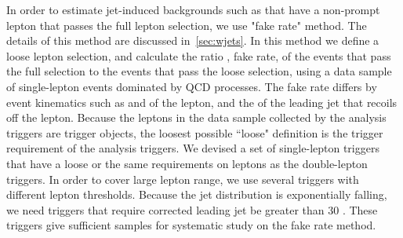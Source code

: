 In order to estimate jet-induced backgrounds such as \Wjets{} that have a non-prompt 
lepton that passes the full lepton selection, we use "fake rate" method.  
The details of this method are discussed in~\ref{sec:wjets}. 
In this method we define a loose lepton selection, and calculate the ratio
, fake rate, of the 
events that pass the full selection to the events that pass the loose 
selection, using a data sample of single-lepton events dominated by QCD processes. 
The fake rate differs by event kinematics
such as \pt{} and \Eta{} of the lepton, and the \pt{} of the leading jet 
that recoils off the lepton. Because the leptons in the data sample
collected by the analysis triggers are trigger objects, the loosest possible 
``loose" definition is the trigger requirement of the analysis triggers.
We devised a set of single-lepton triggers that have a loose or the same requirements 
on leptons as the double-lepton triggers. 
In order to cover large lepton \pt{} range, 
we use several triggers with different lepton \pt{} thresholds.
Because the jet \pt{} distribution is exponentially falling, 
we need triggers that require corrected leading jet \pt{} be greater than 30 \GeV. 
These triggers give sufficient samples for systematic study on the fake rate method. 



